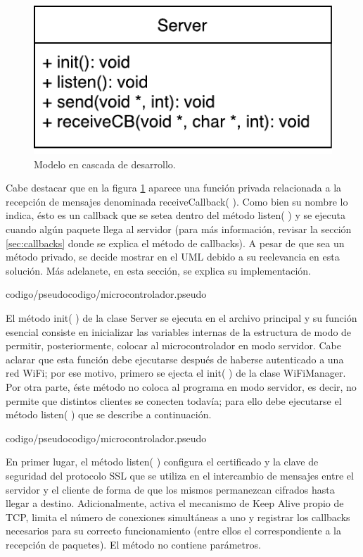 \begin{figure}[!ht]
	\centering
	\includegraphics[width=0.8\linewidth]{imagenes/uml/server.pdf}
	\caption{Modelo en cascada de desarrollo.}
	\label{uml:server}
\end{figure}

Cabe destacar que en la figura \ref{uml:server} aparece una función privada relacionada a la recepción de mensajes denominada receiveCallback( ).
Como bien su nombre lo indica, ésto es un callback que se setea dentro del método listen( ) y se ejecuta cuando algún paquete llega al servidor (para más información, revisar la sección \ref{sec:callbacks} donde se explica el método de callbacks).
A pesar de que sea un método privado, se decide mostrar en el UML debido a su reelevancia en esta solución.
Más adelanete, en esta sección, se explica su implementación.


{codigo/pseudocodigo/microcontrolador.pseudo}

El método init( ) de la clase Server se ejecuta en el archivo principal y su función esencial consiste en inicializar las variables internas de la estructura de modo de permitir, posteriormente, colocar al microcontrolador en modo servidor.
Cabe aclarar que esta función debe ejecutarse después de haberse autenticado a una red WiFi; por ese motivo, primero se ejecta el init( ) de la clase WiFiManager.
Por otra parte, éste método no coloca al programa en modo servidor, es decir, no permite que distintos clientes se conecten todavía; para ello debe ejecutarse el método listen( ) que se describe a continuación.


{codigo/pseudocodigo/microcontrolador.pseudo}

En primer lugar, el método listen( ) configura el certificado y la clave de seguridad del protocolo SSL que se utiliza en el intercambio de mensajes entre el servidor y el cliente de forma de que los mismos permanezcan cifrados hasta llegar a destino.
Adicionalmente, activa el mecanismo de Keep Alive propio de TCP, limita el número de conexiones simultáneas a uno y registrar los callbacks necesarios para su correcto funcionamiento (entre ellos el correspondiente a la recepción de paquetes).
El método no contiene parámetros.

